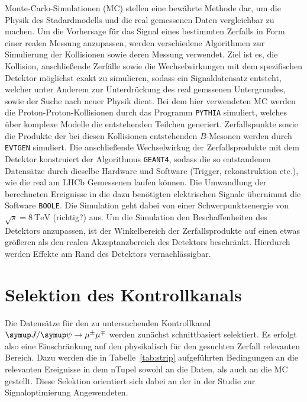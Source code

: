 Monte-Carlo-Simulationen (MC) stellen eine bewährte Methode dar, um die Physik des Stadardmodells und die real gemessenen Daten vergleichbar zu machen. Um die Vorhersage für das Signal eines bestimmten Zerfalls in Form einer realen Messung anzupassen, werden verschiedene Algorithmen zur Simulierung der Kollisionen sowie deren Messung verwendet. Ziel ist es, die Kollision, anschließende Zerfälle sowie die Wechselwirkungen mit dem spezifischen Detektor möglichst exakt zu simulieren, sodass ein Signaldatensatz entsteht, welcher unter Anderem zur Unterdrückung des real gemssenen Untergrundes, sowie der Suche nach neuer Physik dient. Bei dem hier verwendeten MC werden die Proton-Proton-Kollisionen durch das Programm \texttt{PYTHIA} simuliert, welches über komplexe Modelle die entstehenden Teilchen generiert. Zerfallspunkte sowie die Produkte der bei diesen Kollisionen entstehenden $B$-Mesonen werden durch \texttt{EVTGEN} simuliert. Die anschließende Wechselwirkug der Zerfallsprodukte mit dem Detektor konstruiert der Algorithmus \texttt{GEANT4}, sodass die so entstandenen Datensätze durch dieselbe Hardware und Software (Trigger, rekonstruktion etc.), wie die real am LHCb Gemessenen laufen können. Die Umwandlung der berechneten Ereignisse in die dazu benötigten elektrischen Signale übernimmt die Software \texttt{BOOLE}. Die Simulation geht dabei von einer Schwerpunktsenergie von $\sqrt{s}=\SI{8}{\tera\electronvolt}$ (richtig?) aus. Um die Simulation den Beschaffenheiten des Detektors anzupassen, ist der Winkelbereich der Zerfallsprodukte auf einen etwas größeren als den realen Akzeptanzbereich des Detektors beschränkt. Hierdurch werden Effekte am Rand des Detektors vernachlässigbar.

\section{Selektion des Kontrollkanals}
%
Die Datensätze für den zu untersuchenden Kontrollkanal $\kontroll$ werden zunächst schnittbasiert selektiert. Es erfolgt also eine Einschränkung auf den physikalisch für den gesuchten Zerfall relevanten Bereich. Dazu werden die in Tabelle~\ref{tab:strip} aufgeführten Bedingungen an die relevanten Ereignisse in dem nTupel sowohl an die Daten, als auch an die MC gestellt. Diese Selektion orientiert sich dabei an der in der Studie zur Signaloptimierung \cite{ba-maik} Angewendeten.


